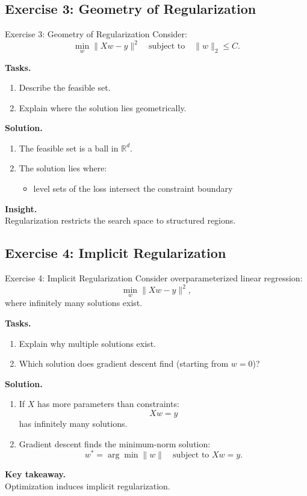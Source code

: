 \documentclass[aspectratio=169,11pt]{beamer}
\begin{document}
\subsection{Exercise 3: Geometry of Regularization}
\begin{frame}[t,allowframebreaks]{Exercise 3: Geometry of Regularization}
\small
Consider:
\[
\min_w \|Xw - y\|^2 \quad \text{subject to} \quad \|w\|_2 \leq C.
\]

\textbf{Tasks.}\\ \begin{enumerate}
    \item Describe the feasible set.
    \item Explain where the solution lies geometrically.
\end{enumerate}

\textbf{Solution.}\\ \begin{enumerate}
\item The feasible set is a ball in $\mathbb{R}^d$.

\item The solution lies where:
\begin{itemize}
    \item level sets of the loss intersect the constraint boundary
\end{itemize}
\end{enumerate}

\textbf{Insight.}\\ Regularization restricts the search space to structured regions.
\end{frame}

\subsection{Exercise 4: Implicit Regularization}
\begin{frame}[t,allowframebreaks]{Exercise 4: Implicit Regularization}
\small
Consider overparameterized linear regression:
\[
\min_w \|Xw - y\|^2,
\]
where infinitely many solutions exist.

\textbf{Tasks.}\\ \begin{enumerate}
    \item Explain why multiple solutions exist.
    \item Which solution does gradient descent find (starting from $w=0$)?
\end{enumerate}

\textbf{Solution.}\\ \begin{enumerate}
\item If $X$ has more parameters than constraints:
\[
Xw = y
\]
has infinitely many solutions.

\item Gradient descent finds the minimum-norm solution:
\[
w^* = \arg\min \|w\| \quad \text{subject to } Xw = y.
\]
\end{enumerate}

\textbf{Key takeaway.}\\ Optimization induces implicit regularization.
\end{frame}
\end{document}
